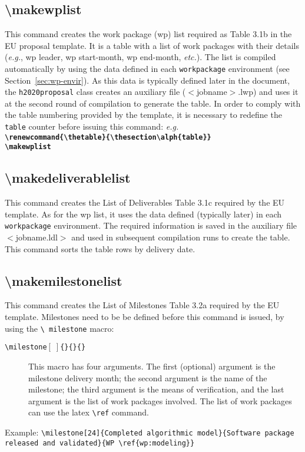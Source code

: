 \documentclass[pdftext]{article}
\begin{document}
\subsection{\textbackslash makewplist}
This command creates the work package (wp) list required as Table 3.1b in the EU proposal template. It is a table with a list of work packages with their details (\emph{e.g.}, wp leader, wp start-month, wp end-month, \emph{etc.}). The list is compiled automatically by using the data defined in each \texttt{workpackage} environment (see Section~\ref{sec:wp-envir}). As this data is typically defined later in the document, the \texttt{h2020proposal} class creates an auxiliary file ($<$jobname$>$.lwp) and uses it at the second round of compilation to generate the table.  In order to comply with the table numbering provided by the template, it is necessary to redefine the \texttt{table} counter before issuing this command: \emph{e.g.}\\
\textbf{\texttt{\textbackslash renewcommand\{\textbackslash thetable\}\{\textbackslash thesection\textbackslash alph\{table\}\}}}\\
\textbf{\texttt{\textbackslash makewplist}}

\subsection{\textbackslash makedeliverablelist}
This command creates the List of Deliverables Table 3.1c required by
the EU template. As for the wp list, it uses the data defined
(typically later) in each \texttt{workpackage} environment. The
required information is saved in the auxiliary file $<$jobname.ldl$>$
and used in subsequent compilation runs to create the table. This
command sorts the table rows by delivery date.

\subsection{\textbackslash makemilestonelist}
This command creates the List of Milestones Table 3.2a required by the
EU template. Milestones need to be be defined before this command is
issued, by using the  \texttt{\textbackslash
  milestone} macro:
\begin{description}
\item[\texttt{\textbackslash milestone$[\;]$\{\}\{\}\{\}}] This macro
  has four arguments. The first (optional) argument is the milestone
  delivery month; the second argument is the name of the milestone;
  the third argument is the means of verification, and the last
  argument is the list of work packages involved. The list of work
  packages can use the latex \texttt{\textbackslash ref} command.
\end{description}
Example: \texttt{\textbackslash milestone[24]\{Completed algorithmic
  model\}\{Software package released and
  validated\}\{WP\,\textbackslash ref\{wp:modeling\}\}}
\end{document}
